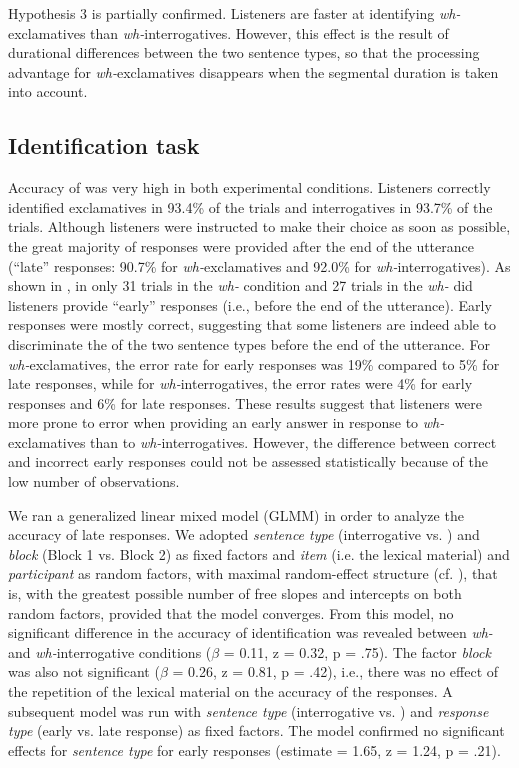 \documentclass[output=paper]{langsci/langscibook}
\begin{document}
Hypothesis 3 is partially confirmed. Listeners are faster at identifying \textit{wh-}exclamatives than \textit{wh-}interrogatives. However, this effect is the result of durational differences between the two sentence types, so that the processing advantage for \textit{wh-}exclamatives disappears when the segmental duration is taken into account.

   
\subsection{Identification task}
\label{sec:kel:5.1}
Accuracy of  was very high in both experimental conditions. Listeners correctly identified exclamatives in 93.4\% of the trials and interrogatives in 93.7\% of the trials. Although listeners were instructed to make their choice as soon as possible, the great majority of responses were provided after the end of the utterance (“late” responses: 90.7\% for \textit{wh-}exclamatives and 92.0\% for \textit{wh-}interrogatives). As shown in , in only 31 trials in the \textit{wh-} condition and 27 trials in the \textit{wh-} did listeners provide “early” responses (i.e., before the end of the utterance). Early responses were mostly correct, suggesting that some listeners are indeed able to discriminate the  of the two sentence types before the end of the utterance. For \textit{wh-}exclamatives, the error rate for early responses was 19\% compared to 5\% for late responses, while for \textit{wh-}interrogatives, the error rates were 4\% for early responses and 6\% for late responses. These results suggest that listeners were more prone to error when providing an early answer in response to \textit{wh-}exclamatives than to \textit{wh-}interrogatives. However, the difference between correct and incorrect early responses could not be assessed statistically because of the low number of observations. 

We ran a generalized linear mixed model (GLMM) in order to analyze the accuracy of late responses. We adopted \textit{sentence type} (interrogative vs. ) and \textit{block} (Block 1 vs. Block 2) as fixed factors and \textit{item} (i.e. the lexical material) and \textit{participant} as random factors, with maximal random-effect structure (cf. \citealt{Barr2013}), that is, with the greatest possible number of free slopes and intercepts on both random factors, provided that the model converges. From this model, no significant difference in the accuracy of identification was revealed between \textit{wh-} and \textit{wh-}interrogative conditions ($\beta $ = 0.11, z = 0.32, p = .75). The factor \textit{block} was also not significant ($\beta $ = 0.26, z = 0.81, p = .42), i.e., there was no effect of the repetition of the lexical material on the accuracy of the responses. A subsequent model was run with \textit{sentence type} (interrogative vs. ) and \textit{response type} (early vs. late response) as fixed factors. The model confirmed no significant effects for \textit{sentence type} for early responses (estimate = 1.65, z = 1.24, p = .21).
\end{document}
